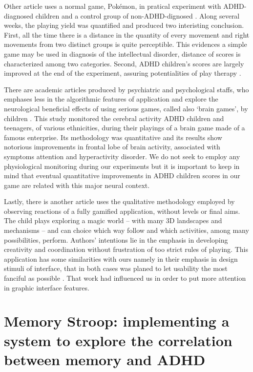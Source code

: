 Other article uses a normal game, Pok\'{e}mon, in pratical experiment with ADHD-diagnosed children and a control group of non-ADHD-dignosed \citep{ADHDGames}. Along several weeks, the playing yield was quantified and produced two interisting conclusion. First, all the time there is a distance in the quantity of every movement and right movements from two distinct groups is quite perceptible. This evidences a simple game may be used in diagnosis of the intellectual disorder, distance of scores is characterized among two categories. Second, ADHD children's scores are largely improved at the end of the experiment, assuring potentialities of play therapy \citep{ADHDGames}.

There are academic articles produced by psychiatric and psychological staffs, who emphases less in the algorithmic features of application and explore the neurological beneficial effects of using serious games, called also `brain games', by children \citep{brainGames}. This study monitored the cerebral activity ADHD children and teenagers, of various ethnicities, during their playings of a brain game made of a famous enterprise. Its methodology was quantitative and its results show notorious improvements in frontal lobe of brain activity, associated with symptoms attention and hyperactivity disorder. We do not seek to employ any physiological monitoring during our experiments but it is important to keep in mind that eventual quantitative improvements in ADHD children scores in our game are related with this major neural context. 

Lastly, there is another article \citep{design} uses the qualitative methodology employed by observing reactions of a fully gamified application, without levels or final aims. The child plays exploring a magic world -- with many 3D landscapes and mechanisms -- and can choice which way follow and which activities, among many possibilities, perform. Authors' intentions lie in the emphasis in developing creativity and coordination without frustration of too strict rules of playing. This application has some similarities with ours namely in their emphasis in design stimuli of interface, that in both cases was planed to let usability the most fanciful as possible \citep{design}. That work had influenced us in order to put more attention in graphic interface features.

\section{Memory Stroop: implementing a system to explore the correlation between memory and ADHD}

